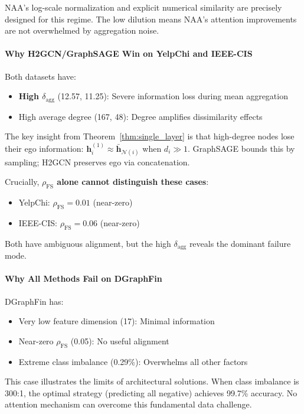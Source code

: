 NAA's log-scale normalization and explicit numerical similarity are precisely designed for this regime. The low dilution means NAA's attention improvements are not overwhelmed by aggregation noise.

\paragraph{Why H2GCN/GraphSAGE Win on YelpChi and IEEE-CIS}

Both datasets have:
\begin{itemize}
    \item \textbf{High $\delta_{\text{agg}}$} (12.57, 11.25): Severe information loss during mean aggregation
    \item High average degree (167, 48): Degree amplifies dissimilarity effects
\end{itemize}

The key insight from Theorem~\ref{thm:single_layer} is that high-degree nodes lose their ego information: $\mathbf{h}_i^{(1)} \approx \bar{\mathbf{h}}_{\mathcal{N}(i)}$ when $d_i \gg 1$. GraphSAGE bounds this by sampling; H2GCN preserves ego via concatenation.

Crucially, \textbf{$\rho_{\text{FS}}$ alone cannot distinguish these cases}:
\begin{itemize}
    \item YelpChi: $\rho_{\text{FS}} = 0.01$ (near-zero)
    \item IEEE-CIS: $\rho_{\text{FS}} = 0.06$ (near-zero)
\end{itemize}
Both have ambiguous alignment, but the high $\delta_{\text{agg}}$ reveals the dominant failure mode.

\paragraph{Why All Methods Fail on DGraphFin}

DGraphFin has:
\begin{itemize}
    \item Very low feature dimension (17): Minimal information
    \item Near-zero $\rho_{\text{FS}}$ (0.05): No useful alignment
    \item Extreme class imbalance (0.29\%): Overwhelms all other factors
\end{itemize}

This case illustrates the limits of architectural solutions. When class imbalance is 300:1, the optimal strategy (predicting all negative) achieves 99.7\% accuracy. No attention mechanism can overcome this fundamental data challenge.

